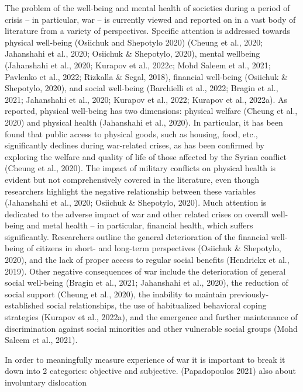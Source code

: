 \documentclass[
  letterpaper,
  DIV=11,
  numbers=noendperiod]{scrartcl}
\begin{document}
The problem of the well-being and mental health of societies during a
period of crisis -- in particular, war -- is currently viewed and
reported on in a vast body of literature from a variety of perspectives.
Specific attention is addressed towards physical well-being (Osiichuk
and Shepotylo 2020) (Cheung et al., 2020; Jahanshahi et al., 2020;
Osiichuk \& Shepotylo, 2020), mental wellbeing (Jahanshahi et al., 2020;
Kurapov et al., 2022c; Mohd Saleem et al., 2021; Pavlenko et al., 2022;
Rizkalla \& Segal, 2018), financial well-being (Osiichuk \& Shepotylo,
2020), and social well-being (Barchielli et al., 2022; Bragin et al.,
2021; Jahanshahi et al., 2020; Kurapov et al., 2022; Kurapov et al.,
2022a). As reported, physical well-being has two dimensions: physical
welfare (Cheung et al., 2020) and physical health (Jahanshahi et al.,
2020). In particular, it has been found that public access to physical
goods, such as housing, food, etc., significantly declines during
war-related crises, as has been confirmed by exploring the welfare and
quality of life of those affected by the Syrian conflict (Cheung et al.,
2020). The impact of military conflicts on physical health is evident
but not comprehensively covered in the literature, even though
researchers highlight the negative relationship between these variables
(Jahanshahi et al., 2020; Osiichuk \& Shepotylo, 2020). Much attention
is dedicated to the adverse impact of war and other related crises on
overall well-being and metal health -- in particular, financial health,
which suffers significantly. Researchers outline the general
deterioration of the financial well-being of citizens in short- and
long-term perspectives (Osiichuk \& Shepotylo, 2020), and the lack of
proper access to regular social benefits (Hendrickx et al., 2019). Other
negative consequences of war include the deterioration of general social
well-being (Bragin et al., 2021; Jahanshahi et al., 2020), the reduction
of social support (Cheung et al., 2020), the inability to maintain
previously-established social relationships, the use of habitualized
behavioral coping strategies (Kurapov et al., 2022a), and the emergence
and further maintenance of discrimination against social minorities and
other vulnerable social groups (Mohd Saleem et al., 2021).

In order to meaningfully measure experience of war it is important to
break it down into 2 categories: objective and subjective. (Papadopoulos
2021) also about involuntary dislocation
\end{document}
